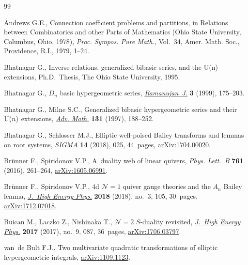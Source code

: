 \documentclass[pdftex]{sigma}%
\numberwithin{equation}{section}
\begin{document}
%
%

\begin{thebibliography}{99}
\footnotesize\itemsep=0pt

Andrews G.E., Connection coefficient problems and partitions, in Relations
 between Combinatorics and other Parts of Mathematics ({O}hio {S}tate {U}niversity, {C}olumbus, {O}hio, 1978),
 \textit{Proc. Sympos. Pure Math.}, Vol.~34, Amer. Math. Soc., Providence,
 R.I., 1979, 1--24.

Bhatnagar G., Inverse relations, generalized bibasic series, and the {U}(n)
 extensions, Ph.D.~Thesis, {T}he Ohio State University, 1995.

Bhatnagar G., {$D_n$} basic hypergeometric series, \href{https://doi.org/10.1023/A:1006997424561}{\textit{Ramanujan~J.}}
 \textbf{3} (1999), 175--203.

Bhatnagar G., Milne S.C., Generalized bibasic hypergeometric series and their
 {${\rm U}(n)$} extensions, \href{https://doi.org/10.1006/aima.1997.1659}{\textit{Adv. Math.}} \textbf{131} (1997), 188--252.

Bhatnagar G., Schlosser M.J., Elliptic well-poised {B}ailey transforms and
 lemmas on root systems, \href{https://doi.org/10.3842/SIGMA.2018.025}{\textit{SIGMA}} \textbf{14} (2018), 025, 44~pages,
 \href{https://arxiv.org/abs/1704.00020}{arXiv:1704.00020}.

Br\"unner F., Spiridonov V.P., A~duality web of linear quivers, \href{https://doi.org/10.1016/j.physletb.2016.08.039}{\textit{Phys.
 Lett.~B}} \textbf{761} (2016), 261--264, \href{https://arxiv.org/abs/1605.06991}{arXiv:1605.06991}.

Br\"unner F., Spiridonov V.P., 4d {${\mathcal N}=1$} quiver gauge theories and
 the {$A_n$} {B}ailey lemma, \href{https://doi.org/10.1007/jhep03(2018)105}{\textit{J.~High Energy Phys.}} \textbf{2018}
 (2018), no.~3, 105, 30~pages, \href{https://arxiv.org/abs/1712.07018}{arXiv:1712.07018}.

Buican M., Laczko Z., Nishinaka T., {${\mathcal N}=2$} {$S$}-duality revisited,
 \href{https://doi.org/10.1007/jhep09(2017)087}{\textit{J.~High Energy Phys.}} \textbf{2017} (2017), no.~9, 087, 36~pages,
 \href{https://arxiv.org/abs/1706.03797}{arXiv:1706.03797}.

van~de Bult F.J., Two multivariate quadratic transformations of elliptic
 hypergeometric integrals, \href{https://arxiv.org/abs/1109.1123}{arXiv:1109.1123}.


\end{thebibliography}
\end{document}
